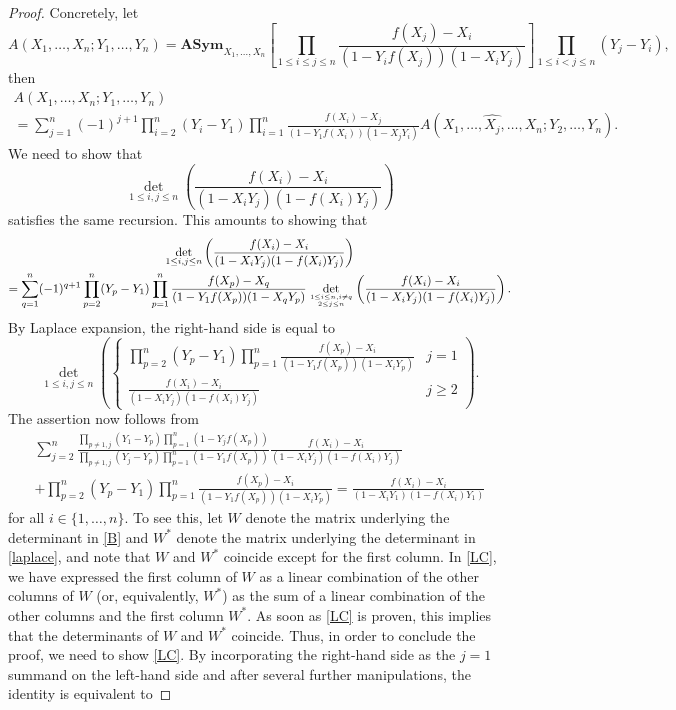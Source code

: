 \documentclass[12pt,dvipsnames]{amsart}
\theoremstyle{definition}
\newcommand{\asym}{\mathbf{ASym}}
\begin{document}
\begin{proof}
Concretely, let
$$A(X_1,\ldots,X_n;Y_1,\ldots,Y_n)=\asym_{X_1,\ldots,X_n} \left[ \prod\limits_{1 \le i \le j \le n} \frac{f(X_j)-X_i}{(1-Y_i f(X_j))(1-X_i Y_j)} \right]\prod_{1\leq i<j\leq n}(Y_j-Y_i),$$
then 
\begin{multline*} 
A(X_1,\ldots,X_n;Y_1,\ldots,Y_n) \\= \sum_{j=1}^{n} (-1)^{j+1} 
\prod_{i=2}^n (Y_i-Y_1) \prod_{i=1}^n \frac{f(X_i)-X_j}{(1-Y_1 f(X_i))(1-X_j Y_i)} 
A(X_1,\ldots,\widehat{X_j},\ldots,X_n;Y_2,\ldots,Y_n).
\end{multline*} 
We need to show that 
\begin{equation} 
\label{B}
\det_{1 \le i, j \le n} \left(\frac{f(X_i)-X_i}{(1-X_i Y_j)(1-f(X_i)Y_j)} \right)
\end{equation} 
satisfies the same recursion. This amounts to showing that 
\begin{multline*} 
 \det_{1 \le i, j \le n} \left(\frac{f(X_i)-X_i}{(1-X_i Y_j)(1-f(X_i)Y_j)} \right) \\
= \sum_{q=1}^{n} (-1)^{q+1} 
\prod_{p=2}^n (Y_p-Y_1) \prod_{p=1}^n \frac{f(X_p)-X_q}{(1-Y_1 f(X_p))(1-X_q Y_p)}  
\det_{1 \le i \le n, i \not=q \atop 2 \le j \le n} \left(\frac{f(X_i)-X_i}{(1-X_i Y_j)(1-f(X_i)Y_j)} \right). 
\end{multline*} 
By Laplace expansion, the right-hand side is equal to 
\begin{equation} 
\label{laplace} 
\det_{1 \le i,j \le n} \left(
\begin{cases} 
\prod_{p=2}^n (Y_p-Y_1) \prod_{p=1}^n \frac{f(X_p)-X_i}{(1-Y_1 f(X_p))(1-X_i Y_p)} & j=1 \\
\frac{f(X_i)-X_i}{(1-X_i Y_j)(1-f(X_i)Y_j)} & j \ge 2 
\end{cases} 
 \right).
\end{equation}The assertion now follows from 
\begin{multline}
\label{LC} 
\sum_{j=2}^n \frac{\prod_{p \not=1,j}(Y_1-Y_p) \prod_{p=1}^{n} (1-Y_j f(X_p))}
{\prod_{p \not=1,j}(Y_j-Y_p) \prod_{p=1}^{n} (1-Y_1 f(X_p))}
\frac{f(X_i)-X_i}{(1-X_i Y_j)(1-f(X_i)Y_j)} \\ + 
\prod_{p=2}^n (Y_p-Y_1) \prod_{p=1}^n \frac{f(X_p)-X_i}{(1-Y_1 f(X_p))(1-X_i Y_p)} 
= \frac{f(X_i)-X_i}{(1-X_i Y_1)(1-f(X_i)Y_1)}
\end{multline}for all $i \in \{1,\ldots,n\}$. 
To see this, let $W$ denote the matrix underlying the determinant in \eqref{B} and $W^{*}$ denote the matrix underlying the 
determinant in \eqref{laplace}, and note that $W$ and $W^{*}$ coincide except for the first column. In \eqref{LC}, 
we have expressed the first column of $W$ as a linear combination of the other columns of $W$ (or, equivalently, $W^*$) 
as the sum of a linear combination of the other columns and the first column $W^*$. 
As soon as \eqref{LC} is proven, this implies that the determinants of 
$W$ and $W^{*}$ coincide. 
Thus, in order to conclude the proof, we need to show \eqref{LC}. By incorporating the right-hand side as the $j=1$ summand 
on the left-hand side and after several further manipulations, the identity is equivalent to 


\end{proof}
\end{document}
